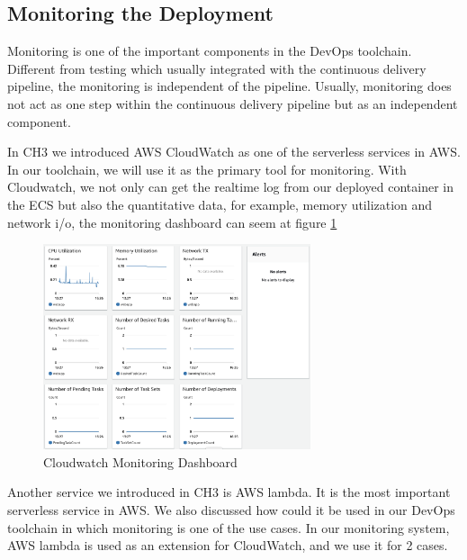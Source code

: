 \subsection{Monitoring the Deployment}
Monitoring is one of the important components in the DevOps toolchain. Different from testing which usually integrated with the continuous delivery pipeline, the monitoring is independent of the pipeline. Usually, monitoring does not act as one step within the continuous delivery pipeline but as an independent component.
\par
In CH3 we introduced AWS CloudWatch as one of the serverless services in AWS. In our toolchain, we will use it as the primary tool for monitoring. With Cloudwatch, we not only can get the realtime log from our deployed container in the ECS but also the quantitative data, for example, memory utilization and network i/o, the monitoring dashboard can seem at figure \ref{fig:monitoring}
\begin{figure}[h]
    \centering
    \includegraphics[width=0.70\textwidth]{pics/monitoring.png}
    \caption{Cloudwatch Monitoring Dashboard}
    \label{fig:monitoring}
\end{figure}
Another service we introduced in CH3 is AWS lambda. It is the most important serverless service in AWS. We also discussed how could it be used in our DevOps toolchain in which monitoring is one of the use cases. In our monitoring system, AWS lambda is used as an extension for CloudWatch, and we use it for 2 cases.
